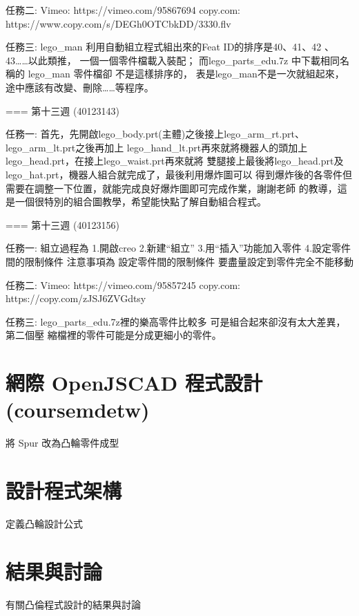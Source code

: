 \documentclass[]{article}
\begin{document}
任務二: Vimeo: https://vimeo.com/95867694 copy.com:
https://www.copy.com/s/DEGh0OTCbkDD/3330.flv

任務三: lego\_man 利用自動組立程式組出來的Feat ID的排序是40、41、42
、43\ldots{}\ldots{}以此類推， 一個一個零件檔載入裝配；
而lego\_parts\_edu.7z 中下載相同名稱的 lego\_man 零件檔卻
不是這樣排序的，
表是lego\_man不是一次就組起來，途中應該有改變、刪除\ldots{}\ldots{}等程序。

=== 第十三週 (40123143)

任務一:
首先，先開啟lego\_body.prt(主體)之後接上lego\_arm\_rt.prt、lego\_arm\_lt.prt之後再加上
lego\_hand\_lt.prt再來就將機器人的頭加上lego\_head.prt，在接上lego\_waist.prt再來就將
雙腿接上最後將lego\_head.prt及lego\_hat.prt，機器人組合就完成了，最後利用爆炸圖可以
得到爆炸後的各零件但需要在調整一下位置，就能完成良好爆炸圖即可完成作業，謝謝老師
的教導，這是一個很特別的組合圖教學，希望能快點了解自動組合程式。

=== 第十三週 (40123156)

任務一: 組立過程為 1.開啟creo 2.新建``組立'' 3.用``插入''功能加入零件
4.設定零件間的限制條件 注意事項為 設定零件間的限制條件
要盡量設定到零件完全不能移動

任務二: Vimeo: https://vimeo.com/95857245 copy.com:
https://copy.com/zJSJ6ZVGdtsy

任務三: lego\_parts\_edu.7z裡的樂高零件比較多
可是組合起來卻沒有太大差異，第二個壓
縮檔裡的零件可能是分成更細小的零件。

\section{網際 OpenJSCAD
程式設計(coursemdetw)}\label{ux7db2ux969b-openjscad-ux7a0bux5f0fux8a2dux8a08coursemdetw}

將 Spur 改為凸輪零件成型

\section{設計程式架構}\label{ux8a2dux8a08ux7a0bux5f0fux67b6ux69cb}

定義凸輪設計公式

\section{結果與討論}\label{ux7d50ux679cux8207ux8a0eux8ad6-5}

有關凸倫程式設計的結果與討論
\end{document}
